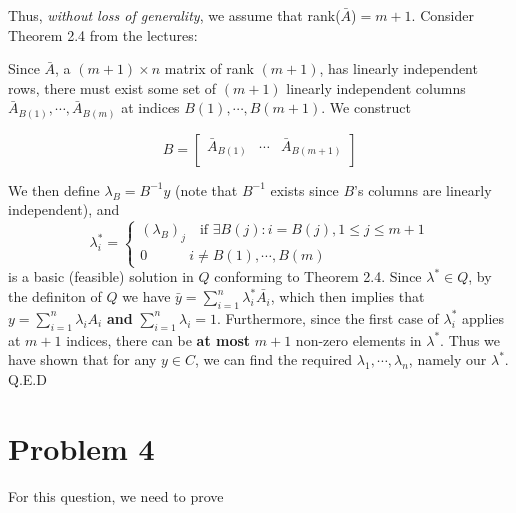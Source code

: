 \documentclass[11pt]{article}
\begin{document}
Thus, \emph{without loss of generality}, we assume that rank($\bar{A}$)$=m+1$. Consider Theorem 2.4 from the lectures:

\bigskip

\noindent{}

Since $\bar{A}$, a $(m+1)\times n$ matrix of rank $(m+1)$, has linearly independent rows, there must exist some set of $(m+1)$ linearly independent columns $\bar{A}_{B(1)},\cdots, \bar{A}_{B(m)}$ at indices $B(1),\cdots, B(m+1)$. We construct

$$
B=\begin{bmatrix}
\bar{A}_{B(1)} & \cdots & \bar{A}_{B(m+1)} \\
\end{bmatrix}
$$

We then define $\lambda_B=B^{-1}y$ (note that $B^{-1}$ exists since $B$'s columns are linearly independent), and
$$
\lambda_i^* = \begin{cases}
(\lambda_B)_j\quad \text{if }\exists B(j):i=B(j), 1\leq j\leq m+1\\
0\quad\quad\quad i\neq B(1), \cdots, B(m)
\end{cases}
$$
is a basic (feasible) solution in $Q$ conforming to Theorem 2.4. Since $\lambda^*\in Q$, by the definiton of $Q$ we have $\bar{y}=\sum_{i=1}^n\lambda_i^*\bar{A_i}$, which then implies that $y=\sum_{i=1}^n\lambda_iA_i$ \textbf{and} $\sum_{i=1}^n\lambda_i=1$. Furthermore, since the first case of $\lambda_i^*$ applies at $m+1$ indices, there can be \textbf{at most} $m+1$ non-zero elements in $\lambda^*$. Thus we have shown that for any $y\in C$, we can find the required $\lambda_1,\cdots, \lambda_n$, namely our $\lambda^*$. Q.E.D


\section*{Problem 4}
For this question, we need to prove
\end{document}
